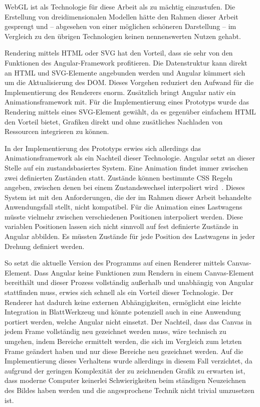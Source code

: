 WebGL ist als Technologie für diese Arbeit als zu mächtig einzustufen. Die Erstellung von dreidimensionalen Modellen hätte den Rahmen dieser Arbeit gesprengt und -- abgesehen von einer möglichen schöneren Darstellung -- im Vergleich zu den übrigen Technologien keinen nennenswerten Nutzen gehabt.

Rendering mittels HTML oder SVG hat den Vorteil, dass sie sehr von den Funktionen des Angular-Framework profitieren. Die Datenstruktur kann direkt an HTML und SVG-Elemente angebunden werden und Angular kümmert sich um die Aktualisierung des DOM. Dieses Vorgehen reduziert den Aufwand für die Implementierung des Renderers enorm. Zusätzlich bringt Angular nativ ein Animationsframework mit. Für die Implementierung eines Prototyps wurde das Rendering mittels eines SVG-Element gewählt, da es gegenüber einfachem HTML den Vorteil bietet, Grafiken direkt und ohne zusätliches Nachladen von Ressourcen integrieren zu können.

In der Implementierung des Prototyps erwies sich allerdings das Animationsframework als ein Nachteil dieser Technologie. Angular setzt an dieser Stelle auf ein zustandsbasiertes System. Eine Animation findet immer zwischen zwei definierten Zuständen statt. Zustände können bestimmte CSS Regeln angeben, zwischen denen bei einem Zustandswechsel interpoliert wird~\cite{angular-animations}. Dieses System ist mit den Anforderungen, die der im Rahmen dieser Arbeit behandelte Anwendungsfall stellt, nicht kompatibel. Für die Animation eines Lastwagens müsste vielmehr zwischen verschiedenen Positionen interpoliert werden. Diese variablen Positionen lassen sich nicht sinnvoll auf fest definierte Zustände in Angular abbilden. Es müssten Zustände für jede Position des Lastwagens in jeder Drehung definiert werden.

So setzt die aktuelle Version des Programms auf einen Renderer mittels Canvas-Element. Dass Angular keine Funktionen zum Rendern in einem Canvas-Element bereithält und dieser Prozess vollständig außerhalb und unabhängig von Angular stattfinden muss, erwies sich schnell als ein Vorteil dieser Technologie. Der Renderer hat dadurch keine externen Abhängigkeiten, ermöglicht eine leichte Integration in BlattWerkzeug und könnte potenziell auch in eine Anwendung portiert werden, welche Angular nicht einsetzt. Der Nachteil, dass das Canvas in jedem Frame vollständig neu gezeichnet werden muss, wäre technisch zu umgehen, indem Bereiche ermittelt werden, die sich im Vergleich zum letzten Frame geändert haben und nur diese Bereiche neu gezeichnet werden. Auf die Implementierung dieses Verhaltens wurde allerdings in diesem Fall verzichtet, da aufgrund der geringen Komplexität der zu zeichnenden Grafik zu erwarten ist, dass moderne Computer keinerlei Schwierigkeiten beim ständigen Neuzeichnen des Bildes haben werden und die angesprochene Technik nicht trivial umzusetzen ist.

